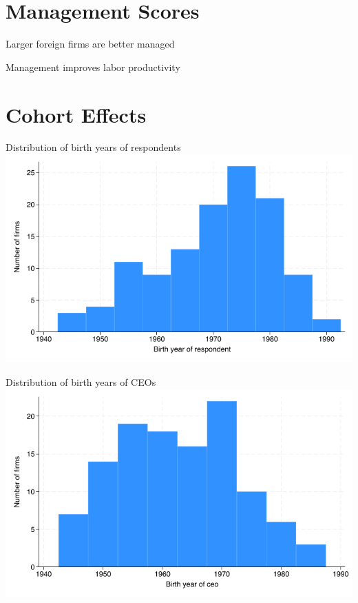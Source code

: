 \documentclass[
  ignorenonframetext,
  aspectratio=1610,
]{beamer}
\begin{document}
\section{Management Scores}\label{management-scores}

\begin{frame}{Larger foreign firms are better managed}
\protect\hypertarget{larger-foreign-firms-are-better-managed}{}

\end{frame}

\begin{frame}{Management improves labor productivity}
\protect\hypertarget{management-improves-labor-productivity}{}

\end{frame}

\section{Cohort Effects}\label{cohort-effects}

\begin{frame}{Distribution of birth years of respondents}
\protect\hypertarget{distribution-of-birth-years-of-respondents}{}
\includegraphics{fig/cohort-respondent-histogram.png}
\end{frame}

\begin{frame}{Distribution of birth years of CEOs}
\protect\hypertarget{distribution-of-birth-years-of-ceos}{}
\includegraphics{fig/cohort-ceo-histogram.png}
\end{frame}
\end{document}
